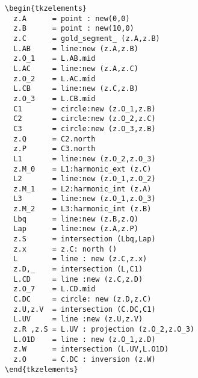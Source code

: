 \begin{minipage}{.4\textwidth}
\begin{Verbatim}
\begin{tkzelements}
  z.A      = point : new(0,0)
  z.B      = point : new(10,0)
  z.C      = gold_segment_ (z.A,z.B)
  L.AB     = line:new (z.A,z.B)
  z.O_1    = L.AB.mid
  L.AC     = line:new (z.A,z.C)
  z.O_2    = L.AC.mid
  L.CB     = line:new (z.C,z.B)
  z.O_3    = L.CB.mid
  C1       = circle:new (z.O_1,z.B)
  C2       = circle:new (z.O_2,z.C)
  C3       = circle:new (z.O_3,z.B)
  z.Q      = C2.north
  z.P      = C3.north
  L1       = line:new (z.O_2,z.O_3)
  z.M_0    = L1:harmonic_ext (z.C)
  L2       = line:new (z.O_1,z.O_2)
  z.M_1    = L2:harmonic_int (z.A)
  L3       = line:new (z.O_1,z.O_3)
  z.M_2    = L3:harmonic_int (z.B)
  Lbq      = line:new (z.B,z.Q)
  Lap      = line:new (z.A,z.P)
  z.S      = intersection (Lbq,Lap)
  z.x      = z.C: north ()
  L        = line : new (z.C,z.x)
  z.D,_    = intersection (L,C1)
  L.CD     = line :new (z.C,z.D)
  z.O_7    = L.CD.mid
  C.DC     = circle: new (z.D,z.C)
  z.U,z.V  = intersection (C.DC,C1)
  L.UV     = line :new (z.U,z.V)
  z.R ,z.S = L.UV : projection (z.O_2,z.O_3)
  L.O1D    = line : new (z.O_1,z.D)
  z.W      = intersection (L.UV,L.O1D)
  z.O      = C.DC : inversion (z.W)
\end{tkzelements}
\end{Verbatim}
\end{minipage}
\begin{minipage}{.6\textwidth}

\begin{center}
\end{center}


\end{minipage}

